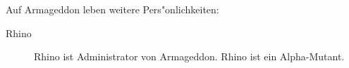 
Auf Armageddon leben weitere Pers"onlichkeiten: 

\begin{description}    
    \item[Rhino] Rhino ist Administrator von Armageddon. Rhino ist ein Alpha-Mutant. 
\end{description}
